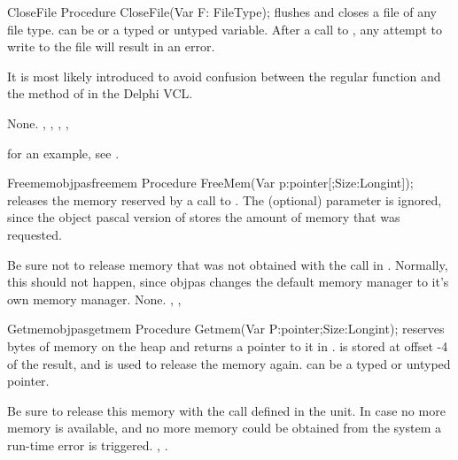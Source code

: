 
\begin{procedure}{CloseFile}
\Declaration
Procedure CloseFile(Var F: FileType);
\Description
{} flushes and closes a file  of any file type.
 can be   or a typed or untyped  variable.
After a call to , any attempt to write to the file 
will result in an error.

It is most likely introduced to avoid confusion between the regular
 function and the  method of 
in the Delphi VCL.

\Errors
None.
\SeeAlso
{}, , , , 
\end{procedure}

for an example, see .

\begin{procedurel}{Freemem}{objpasfreemem}
\Declaration
Procedure FreeMem(Var p:pointer[;Size:Longint]);
\Description
{} releases the memory reserved by a call to
. The (optional)  parameter is
ignored, since the object pascal version of  stores the amount
of memory that was requested.

Be sure not to release memory that was not obtained with the 
call in . Normally, this should not happen, since objpas
changes the default memory manager to it's own memory manager.
\Errors
None.
\SeeAlso
{}, , 
\end{procedurel}


\begin{procedurel}{Getmem}{objpasgetmem}
\Declaration
Procedure Getmem(Var P:pointer;Size:Longint);
\Description
{} reserves  bytes of memory on the heap and returns
a pointer to it in .  is stored at offset -4 of the
result, and is used to release the memory again.  can be a typed or
untyped pointer.

Be sure to release this memory with the  call
defined in the  unit.
\Errors
In case no more memory is available, and no more memory could be obtained
from the system a run-time error is triggered.
\SeeAlso
{}, .
\end{procedurel}

